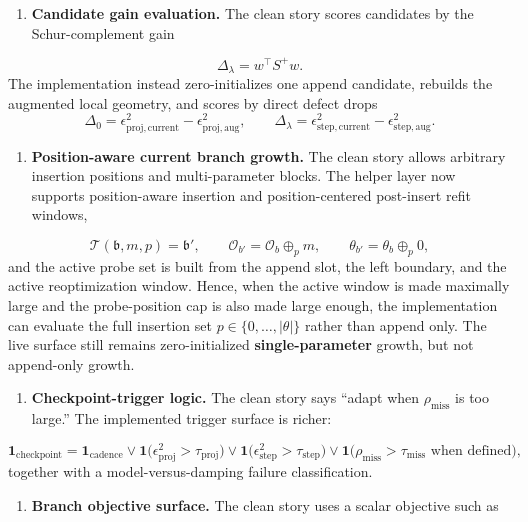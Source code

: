 \documentclass[11pt]{article}
\begin{document}
\begin{enumerate}
\item \textbf{Candidate gain evaluation.} The clean story scores candidates by the Schur-complement gain
\end{enumerate}

\[
   \Delta_\lambda=w^\top S^+w.
\]
   The implementation instead zero-initializes one append candidate, rebuilds the augmented local geometry, and scores by direct defect drops
\[
   \Delta_0=\epsilon_{\mathrm{proj,current}}^2-\epsilon_{\mathrm{proj,aug}}^2,
   \qquad
   \Delta_\lambda=\epsilon_{\mathrm{step,current}}^2-\epsilon_{\mathrm{step,aug}}^2.
\]

\begin{enumerate}
\item \textbf{Position-aware current branch growth.} The clean story allows arbitrary insertion positions and multi-parameter blocks. The helper layer now supports position-aware insertion and position-centered post-insert refit windows,
\end{enumerate}

\[
   \mathcal T(\mathfrak b,m,p)=\mathfrak b',
   \qquad
   \mathcal O_{b'}=\mathcal O_b\oplus_p m,
   \qquad
   \theta_{b'}=\theta_b\oplus_p 0,
\]
   and the active probe set is built from the append slot, the left boundary, and the active reoptimization window. Hence, when the active window is made maximally large and the probe-position cap is also made large enough, the implementation can evaluate the full insertion set $p\in\{0,\dots,|\theta|\}$ rather than append only. The live surface still remains zero-initialized \textbf{single-parameter} growth, but not append-only growth.

\begin{enumerate}
\item \textbf{Checkpoint-trigger logic.} The clean story says “adapt when $\rho_{\mathrm{miss}}$ is too large.” The implemented trigger surface is richer:
\end{enumerate}

\[
   \mathbf 1_{\mathrm{checkpoint}}
   =
   \mathbf 1_{\mathrm{cadence}}
   \lor
   \mathbf 1\!\bigl(\epsilon_{\mathrm{proj}}^2>\tau_{\mathrm{proj}}\bigr)
   \lor
   \mathbf 1\!\bigl(\epsilon_{\mathrm{step}}^2>\tau_{\mathrm{step}}\bigr)
   \lor
   \mathbf 1\!\bigl(\rho_{\mathrm{miss}}>\tau_{\mathrm{miss}}\text{ when defined}\bigr),
\]
   together with a model-versus-damping failure classification.

\begin{enumerate}
\item \textbf{Branch objective surface.} The clean story uses a scalar objective such as
\end{enumerate}
\end{document}
